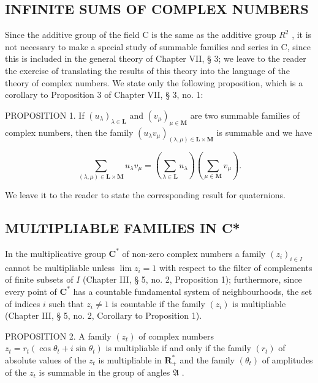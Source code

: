 \subsection{INFINITE SUMS OF COMPLEX NUMBERS}

Since the additive group of the field C is the same as the additive group \(R^{2}\) , it is not necessary to make a special study of summable families and series in C, since this is included in the general theory of Chapter VII, § 3; we leave to the reader the exercise of translating the results of this theory into the language of the theory of complex numbers. We state only the following proposition, which is a corollary to Proposition 3 of Chapter VII, § 3, no. 1:

PROPOSITION 1. If \((u_{\lambda})_{\lambda \in \mathbf{L}}\) and \((v_{\mu})_{\mu \in \mathbf{M}}\) are two summable families of complex numbers, then the family \((u_{\lambda}v_{\mu})_{(\lambda ,\mu)\in \mathbf{L}\times \mathbf{M}}\) is summable and we have

\[
\sum_ {(\lambda , \mu) \in \mathbf {L} \times \mathbf {M}} u _ {\lambda} v _ {\mu} = \left(\sum_ {\lambda \in \mathbf {L}} u _ {\lambda}\right) \left(\sum_ {\mu \in \mathbf {M}} v _ {\mu}\right).\tag{1}
\]

We leave it to the reader to state the corresponding result for quaternions.

\subsection{MULTIPLIABLE FAMILIES IN C*}

In the multiplicative group \(\mathbf{C}^*\) of non-zero complex numbers a family \((z_{i})_{i\in I}\) cannot be multipliable unless \(\lim z_{i} = 1\) with respect to the filter of complements of finite subsets of \(I\) (Chapter III, § 5, no. 2, Proposition 1); furthermore, since every point of \(\mathbf{C}^*\) has a countable fundamental system of neighbourhoods, the set of indices \(i\) such that \(z_{i}\neq 1\) is countable if the family \((z_{i})\) is multipliable (Chapter III, § 5, no. 2, Corollary to Proposition 1).

PROPOSITION 2. A family \((z_{t})\) of complex numbers \(z_{t} = r_{t}(\cos \theta_{t} + i\sin \theta_{t})\) is multipliable if and only if the family \((r_{t})\) of absolute values of the \(z_{t}\) is multipliable in \(\mathbf{R}_{+}^{*}\) and the family \((\theta_{t})\) of amplitudes of the \(z_{t}\) is summable in the group of angles \(\mathfrak{A}\) .

